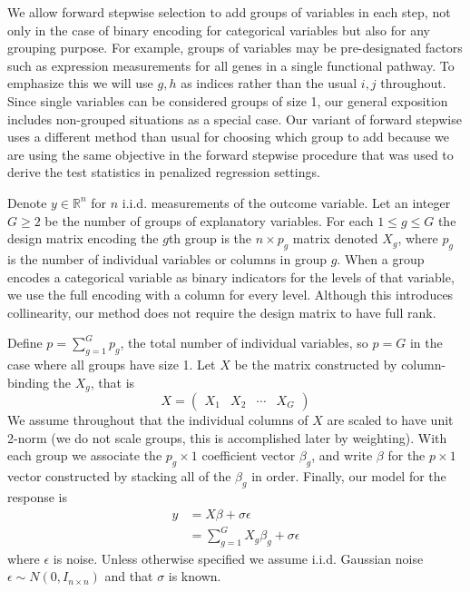 \documentclass{imsart}
\newcommand{\real}{\mathbb{R}}
\begin{document}
We allow forward stepwise selection to add groups of variables in each
step, not only in the case of binary encoding for categorical
variables but also for any grouping purpose. For example, groups of
variables may be pre-designated factors such as expression
measurements for all genes in a single functional pathway.
To emphasize this we will use $g, h$ as indices rather than the usual
$i, j$ throughout. Since single variables can be considered groups of
size 1, our general exposition includes non-grouped situations as a special
case. Our variant of forward stepwise uses a different method than
usual for choosing which group to add because we are using the
same objective in the forward stepwise procedure that was used to
derive the test statistics in penalized regression settings.

Denote $y \in \real^n$ for $n$ i.i.d. measurements of the outcome variable.
Let an integer $G \geq 2$ be the number of groups of explanatory variables.
For each $1 \leq g \leq G$ the design matrix encoding the
$g$th group is the $n \times p_g$ matrix denoted $X_g$, where $p_g$ is
the number of individual variables or columns in group $g$. When a group
encodes a categorical variable as binary indicators for the levels of
that variable, we use the full encoding with a column for every level.
Although this introduces collinearity, our method does not require the
design matrix to have full rank.


Define $p = \sum_{g=1}^Gp_g$,
the total number of individual variables, so $p = G$ in the
case where all groups have size 1. Let $X$ be the matrix constructed
by column-binding the $X_g$, that is  
\begin{equation*}
X = \begin{pmatrix} X_1 & X_2 & \cdots & X_G  \end{pmatrix}
\end{equation*}
We assume throughout that the individual columns of $X$ are scaled to
have unit 2-norm (we do not scale groups, this is accomplished later
by weighting).
With each group we associate the $p_g \times 1$ coefficient vector
$\beta_g$, and write $\beta$ for the $p \times 1$ vector constructed
by stacking all of the $\beta_g$ in order.  Finally, our model for the
response is
\begin{equation}
\begin{aligned}
\label{eq:gmodel}
y & = X \beta + \sigma \epsilon \\
   & = \sum_{g=1}^G X_g \beta_g + \sigma \epsilon
\end{aligned}
\end{equation}
where $\epsilon$ is noise. Unless otherwise specified we assume
i.i.d. Gaussian noise $\epsilon \sim N(0, I_{n \times n})$ and that
$\sigma$ is known.
\end{document}
